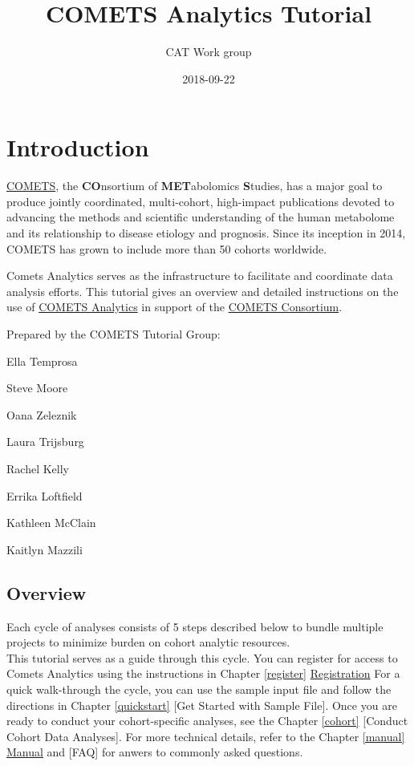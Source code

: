 \documentclass[]{book}
\title{COMETS Analytics Tutorial}
\author{CAT Work group}
\date{2018-09-22}
\begin{document}
\maketitle

{
\setcounter{tocdepth}{1}
\tableofcontents
}
\chapter*{Introduction}\label{introduction}

\href{https://epi.grants.cancer.gov/comets/}{COMETS}, the
\textbf{CO}nsortium of \textbf{MET}abolomics \textbf{S}tudies, has a
major goal to produce jointly coordinated, multi-cohort, high-impact
publications devoted to advancing the methods and scientific
understanding of the human metabolome and its relationship to disease
etiology and prognosis. Since its inception in 2014, COMETS has grown to
include more than 50 cohorts worldwide.

Comets Analytics serves as the infrastructure to facilitate and
coordinate data analysis efforts. This tutorial gives an overview and
detailed instructions on the use of
\href{http://www.comets-analytics.org}{COMETS Analytics} in support of
the \href{https://epi.grants.cancer.gov/comets/}{COMETS Consortium}.

Prepared by the COMETS Tutorial Group:

Ella Temprosa

Steve Moore

Oana Zeleznik

Laura Trijsburg

Rachel Kelly

Errika Loftfield

Kathleen McClain

Kaitlyn Mazzili

\section*{Overview}\label{overview}

Each cycle of analyses consists of 5 steps described below to bundle
multiple projects to minimize burden on cohort analytic resources.\\

This tutorial serves as a guide through this cycle. You can register for
access to Comets Analytics using the instructions in Chapter
\ref{register} \protect\hyperlink{register}{Registration} For a quick
walk-through the cycle, you can use the sample input file and follow the
directions in Chapter \ref{quickstart} {[}Get Started with Sample
File{]}. Once you are ready to conduct your cohort-specific analyses,
see the Chapter \ref{cohort} {[}Conduct Cohort Data Analyses{]}. For
more technical details, refer to the Chapter \ref{manual}
\protect\hyperlink{manual}{Manual} and {[}FAQ{]} for anwers to commonly
asked questions.
\end{document}
